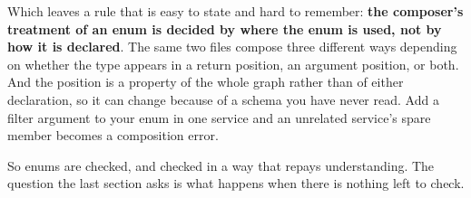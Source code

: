 %
Which leaves a rule that is easy to state and hard to remember: \textbf{the
composer's treatment of an enum is decided by where the enum is used, not by how
it is declared}. The same two files compose three different ways depending on
whether the type appears in a return position, an argument position, or both. And
the position is a property of the whole graph rather than of either declaration,
so it can change because of a schema you have never read. Add a filter argument
to your enum in one service and an unrelated service's spare member becomes a
composition error.

\medskip
So enums are checked, and checked in a way that repays understanding. The
question the last section asks is what happens when there is nothing left to
check.

%
